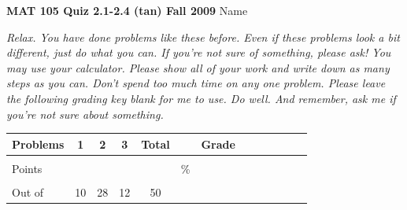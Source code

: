 \documentclass[12pt]{article}
\begin{document}
{\bf MAT 105 Quiz 2.1-2.4 (tan) Fall 2009} \hspace{.4in} {\large Name} \hrulefill

\hrulefill

 \emph{Relax.  You have done problems like these before.  Even if these problems look a bit different, just do what you can.  If you're not sure of something, please ask! You may use your calculator.  Please show all of your work and write down as many steps as you can.  Don't spend too much time on any one problem.  Please leave the following grading key blank for me to use.  Do well.  And remember, ask me if you're not sure about something.}

\begin{center}

\begin{tabular}
{|l|c|c|c|c|c|c|c|c|c|c|c|c|} \hline

 Problems & \hspace{5 pt} 1 \hspace{5 pt}  & \hspace{5 pt} 2 \hspace{5 pt} & \hspace{5 pt} 3 \hspace{5 pt} &  \hspace{5 pt} Total  \hspace{5 pt} & &  \hspace{5 pt} Grade \hspace{5 pt}  \\ \hline
&&&&&&\\  
Points &&&&&    \hspace{.8in}\% &  \\ 
&&&&&& \\  \hline
Out of & 10 & 28 & 12 &50 & & \\ \hline

\end {tabular}

\end{center}

\hrulefill
\end{document}
